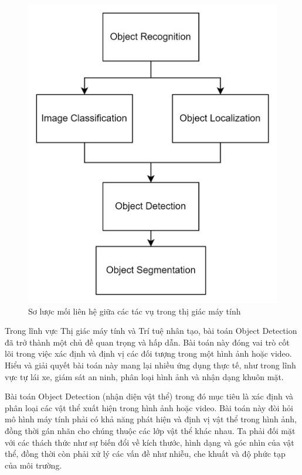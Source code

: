 \graphicspath{{figures/}}
\begin{figure}[h!]
  \centering
  \includegraphics[scale=0.18]{graphics/general.png}
  \caption{Sơ lược mối liên hệ giữa các tác vụ trong thị giác máy tính}
\end{figure}
Trong lĩnh vực Thị giác máy tính và Trí tuệ nhân tạo, bài toán Object Detection đã trở thành một chủ đề quan trọng và hấp dẫn. Bài toán này đóng vai trò cốt lõi trong việc xác định và định vị các đối tượng trong một hình ảnh hoặc video. Hiểu và giải quyết bài toán này mang lại nhiều ứng dụng thực tế, như trong lĩnh vực tự lái xe, giám sát an ninh, phân loại hình ảnh và nhận dạng khuôn mặt.

Bài toán Object Detection (nhận diện vật thể) trong đó mục tiêu là xác định và phân loại các vật thể xuất hiện trong hình ảnh hoặc video. Bài toán này đòi hỏi mô hình máy tính phải có khả năng phát hiện và định vị vật thể trong hình ảnh, đồng thời gán nhãn cho chúng thuộc các lớp vật thể khác nhau. Ta phải đối mặt với các thách thức như sự biến đổi về kích thước, hình dạng và góc nhìn của vật thể, đồng thời còn phải xử lý các vấn đề như nhiễu, che khuất và độ phức tạp của môi trường.

